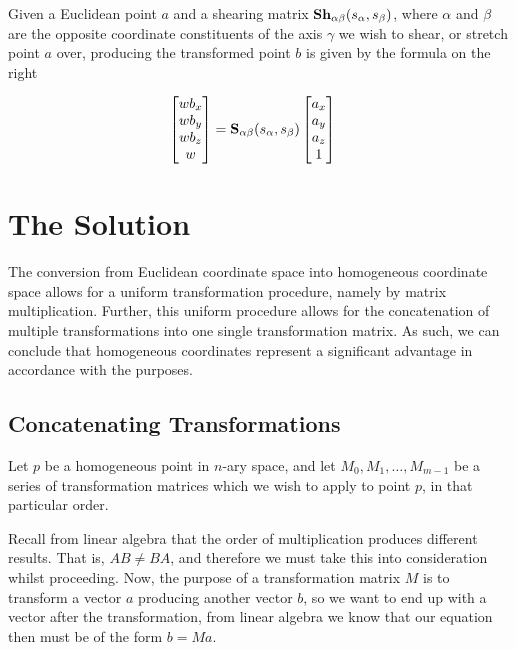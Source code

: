 \documentclass[11pt]{article}
\begin{document}
\begin{multicols}{2}

Given a Euclidean point $a$ and a shearing matrix $\text{\bf Sh}_{\alpha
\beta}(s_\alpha, s_\beta)$, where $\alpha$ and $\beta$ are the opposite
coordinate constituents of the axis $\gamma$ we wish to shear, or stretch
point $a$ over, producing the transformed point $b$ is given by the formula
on the right

\vfill\columnbreak

\scriptsize
\begin{align}
    \begin{bmatrix}
        w b_x \\
        w b_y \\
        w b_z \\
        w
    \end{bmatrix}
    &=
    \text{\bf S}_{\alpha\beta}(s_\alpha, s_\beta)
    \begin{bmatrix}
        a_x \\
        a_y \\
        a_z \\
        1
    \end{bmatrix}
\end{align}
\normalsize

\vspace*{\fill}

\end{multicols}

\newpage
\section{The Solution}
The conversion from Euclidean coordinate space into homogeneous coordinate
space allows for a uniform transformation procedure, namely by matrix
multiplication. Further, this uniform procedure allows for the concatenation
of multiple transformations into one single transformation matrix. As such,
we can conclude that homogeneous coordinates represent a significant advantage
in accordance with the purposes.

\subsection{Concatenating Transformations}
Let $p$ be a homogeneous point in $n$-ary space, and let $M_0, M_1, \dots,
M_{m-1}$ be a series of transformation matrices which we wish to apply to
point $p$, in that particular order.

Recall from linear algebra that the order of multiplication produces different
results. That is, $AB \neq BA$, and therefore we must take this into
consideration whilst proceeding. Now, the purpose of a transformation matrix
$M$ is to transform a vector $a$ producing another vector $b$, so we want to
end up with a vector after the transformation, from linear algebra we know
that our equation then must be of the form $b = M a$.
\end{document}
